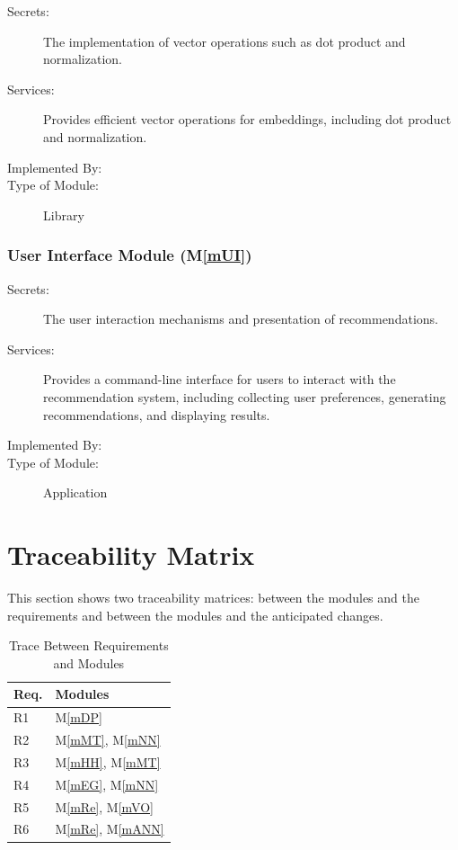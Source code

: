 \documentclass[12pt, titlepage]{article}
\newcommand{\mref}[1]{M\ref{#1}}
\begin{document}
\begin{description}
\item[Secrets:]The implementation of vector operations such as dot product and normalization.
\item[Services:]Provides efficient vector operations for embeddings, including dot product and normalization.
\item[Implemented By:] \progname
\item[Type of Module:] Library
\end{description}

\subsubsection{User Interface Module (\mref{mUI})}

\begin{description}
\item[Secrets:] The user interaction mechanisms and presentation of recommendations.
\item[Services:] Provides a command-line interface for users to interact with the recommendation system, including collecting user preferences, generating recommendations, and displaying results.
\item[Implemented By:] \progname
\item[Type of Module:] Application
\end{description}

\section{Traceability Matrix} \label{SecTM}

This section shows two traceability matrices: between the modules and the
requirements and between the modules and the anticipated changes.

\begin{table}[H]
\centering
\begin{tabular}{p{} p{}}
\toprule
\textbf{Req.} & \textbf{Modules}\\
\midrule
R1 & \mref{mDP}\\
R2 & \mref{mMT}, \mref{mNN}\\
R3 & \mref{mHH}, \mref{mMT}\\
R4 & \mref{mEG}, \mref{mNN}\\
R5 & \mref{mRe}, \mref{mVO}\\
R6 & \mref{mRe}, \mref{mANN}\\
\bottomrule
\end{tabular}
\caption{Trace Between Requirements and Modules}
\label{TblRT}
\end{table}
\end{document}
